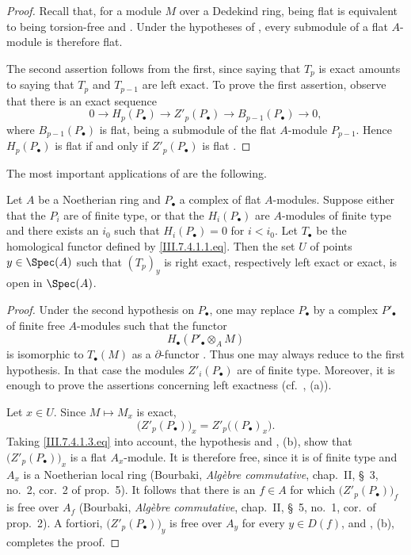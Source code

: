 \begin{proof}
Recall that, for a module $M$ over a Dedekind ring, being flat
is equivalent to being torsion-free  and
.  Under the hypotheses of
, every submodule of a flat $A$-module is
therefore flat.

The second assertion follows from the first, since saying that
$T_p$ is exact amounts to saying that $T_p$ and $T_{p-1}$ are
left exact.  To prove the first assertion, observe that there
is an exact sequence
\[
  0
  \longrightarrow H_p(P_\bullet)
  \longrightarrow Z'_p(P_\bullet)
  \longrightarrow B_{p-1}(P_\bullet)
  \longrightarrow 0,
\]
where $B_{p-1}(P_\bullet)$ is flat, being a submodule of the
flat $A$-module $P_{p-1}$.  Hence $H_p(P_\bullet)$ is flat if
and only if $Z'_p(P_\bullet)$ is flat
.
\end{proof}

The most important applications of  are the
following.

\begin{proposition}[7.4.4]
\label{III.7.4.4}
Let $A$ be a Noetherian ring and $P_\bullet$ a complex of flat
$A$-modules.  Suppose either that the $P_i$ are of finite
type, or that the $H_i(P_\bullet)$ are $A$-modules of finite
type and there exists an $i_0$ such that
$H_i(P_\bullet)=0$ for $i<i_0$.  Let $T_\bullet$ be the
homological functor defined by \eqref{III.7.4.1.1.eq}.  Then
the set $U$ of points $y\in\Spec(A)$ such that $(T_p)_y$
 is right exact, respectively left exact or
exact, is open in $\Spec(A)$.
\end{proposition}

\begin{proof}
Under the second hypothesis on $P_\bullet$, one may replace
$P_\bullet$ by a complex $P'_\bullet$ of finite free
$A$-modules such that the functor
\[
  H_\bullet(P'_\bullet\otimes_A M)
\]
is isomorphic to $T_\bullet(M)$ as a $\partial$-functor
.  Thus one may always reduce to the first
hypothesis.  In that case the modules $Z'_i(P_\bullet)$ are of
finite type.  Moreover, it is enough to prove the assertions
concerning left exactness (cf.\ , (a)).

Let $x\in U$.  Since $M\mapsto M_x$ is exact,
\[
  \bigl(Z'_p(P_\bullet)\bigr)_x
  =
  Z'_p\bigl((P_\bullet)_x\bigr).
\]
Taking \eqref{III.7.4.1.3.eq} into account, the hypothesis and
, (b), show that
$\bigl(Z'_p(P_\bullet)\bigr)_x$ is a flat $A_x$-module.  It is
therefore free, since it is of finite type and $A_x$ is a
Noetherian local ring (Bourbaki,
\emph{Alg\`ebre commutative}, chap.~II, \S~3, no.~2, cor.~2
of prop.~5).  It follows that there is an $f\in A$ for which
$\bigl(Z'_p(P_\bullet)\bigr)_f$ is free over $A_f$
(Bourbaki, \emph{Alg\`ebre commutative}, chap.~II, \S~5,
no.~1, cor.\ of prop.~2).  A fortiori,
$\bigl(Z'_p(P_\bullet)\bigr)_y$ is free over $A_y$ for every
$y\in D(f)$, and , (b), completes the proof.
\end{proof}

